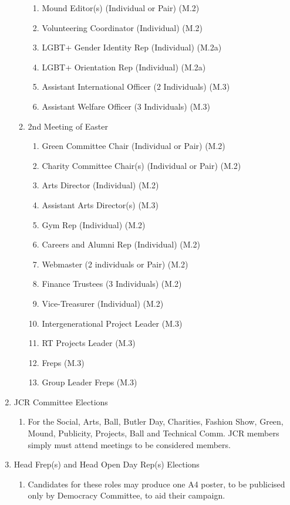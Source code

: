 \begin{enumerate}
\begin{enumerate}
\begin{enumerate}
            \item Mound Editor(s) (Individual or Pair) (M.2)
            \item Volunteering Coordinator (Individual) (M.2)
            \item LGBT+ Gender Identity Rep (Individual) (M.2a)
            \item LGBT+ Orientation Rep (Individual) (M.2a)
            \item Assistant International Officer (2 Individuals) (M.3)
            \item Assistant Welfare Officer (3 Individuals) (M.3)
        \end{enumerate}
        \item 2nd Meeting of Easter
        \begin{enumerate}
            \item Green Committee Chair (Individual or Pair) (M.2)
            \item Charity Committee Chair(s) (Individual or Pair) (M.2)
            \item Arts Director (Individual) (M.2)
            \item Assistant Arts Director(s) (M.3)
            \item Gym Rep (Individual) (M.2)
            \item Careers and Alumni Rep (Individual) (M.2)
            \item Webmaster (2 individuals or Pair) (M.2)
            \item Finance Trustees (3 Individuals) (M.2)
            \item Vice-Treasurer (Individual) (M.2)
            \item Intergenerational Project Leader (M.3)
            \item RT Projects Leader (M.3)
            \item Freps (M.3)
            \item Group Leader Freps (M.3)
        \end{enumerate}
    \end{enumerate}
    \item JCR Committee Elections
    \begin{enumerate}
        \item For the Social, Arts, Ball, Butler Day, Charities, Fashion Show, Green, Mound, Publicity, Projects, Ball and Technical Comm. JCR members simply must attend meetings to be considered members.
    \end{enumerate}
    \item Head Frep(s) and Head Open Day Rep(s) Elections
    \begin{enumerate}
        \item Candidates for these roles may produce one A4 poster, to be publicised only by Democracy Committee, to aid their campaign.
    \end{enumerate}
\end{enumerate}

